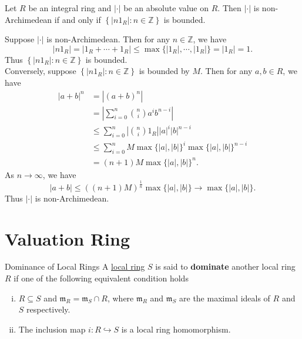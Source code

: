 \begin{proposition}{}{}
    Let $R$ be an integral ring and $|\cdot|$ be an absolute value on $R$. Then $|\cdot|$ is non-Archimedean if and only if $\left\{ |n1_R|:n\in \mathbb{Z}\right\}$ is bounded.
\end{proposition}

\begin{prf}
    Suppose $|\cdot|$ is non-Archimedean. Then for any $n\in\mathbb{Z}$, we have
    \[
        |n1_R|=|1_R+\cdots+1_R|\le \max\{|1_R|,\cdots,|1_R|\}=|1_R|=1.
    \]
    Thus $\left\{ |n1_R|:n\in \mathbb{Z}\right\}$ is bounded.\\
    Conversely, suppose $\left\{ |n1_R|:n\in \mathbb{Z}\right\}$ is bounded by $M$. Then for any $a,b\in R$, we have 
    \begin{align*}
        |a+b|^n&=|(a+b)^n|\\
        &=\left| \sum_{i=0}^n\binom{n}{i}a^ib^{n-i}\right|\\
        &\le \sum_{i=0}^n\left|\binom{n}{i}1_R\right||a|^i|b|^{n-i}\\
        &\le \sum_{i=0}^n M\max\{|a|,|b|\}^i\max\{|a|,|b|\}^{n-i}\\
        &=(n+1) M \max\{|a|,|b|\}^n.
    \end{align*}
    As $n\to \infty$, we have
    \[
        |a+b|\le \left((n+1) M \right)^{\frac{1}{n}}\max\{|a|,|b|\}\to \max\{|a|,|b|\}.
        \]
    Thus $|\cdot|$ is non-Archimedean.
\end{prf}



\section{Valuation Ring}

\begin{definition}{Dominance of Local Rings}{}
    A \hyperref[th:local_commutative_ring]{local ring} $S$ is said to \textbf{dominate} another local ring $R$ if one of the following equivalent condition holds
    \begin{enumerate}[(i)]
        \item $R\subseteq S$ and $\mathfrak{m}_R=\mathfrak{m}_S\cap R$, where $\mathfrak{m}_R$ and $\mathfrak{m}_S$ are the maximal ideals of $R$ and $S$ respectively.
        \item The inclusion map $i:R\hookrightarrow S$ is a local ring homomorphism.
    \end{enumerate}
  
\end{definition}

